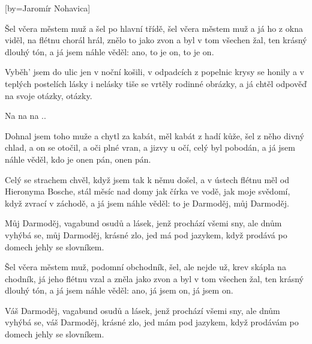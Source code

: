 [by={Jaromír Nohavica}]

\beginverse{}
Šel včera městem muž a šel po hlavní třídě,
šel včera městem muž a já ho z okna viděl,
na flétnu chorál hrál, znělo to jako zvon
a byl v tom všechen žal, ten krásný dlouhý tón,
a já jsem náhle věděl: ano, to je on, to je on.
\endverse{}

\beginverse{}
Vyběh' jsem do ulic jen v noční košili,
v odpadcích z popelnic krysy se honily
a v teplých postelích lásky i nelásky
tiše se vrtěly rodinné obrázky,
a já chtěl odpověď na svoje otázky, otázky.
\endverse{}

\beginchorus{}
Na na na ..    
       
\endchorus{}

\beginverse{}
Dohnal jsem toho muže a chytl za kabát,
měl kabát z hadí kůže, šel z něho divný chlad,
a on se otočil, a oči plné vran,
a jizvy u očí, celý byl pobodán,
a já jsem náhle věděl, kdo je onen pán, onen pán.
\endverse{}

\beginverse{}
Celý se strachem chvěl, když jsem tak k němu došel,
a v ústech flétnu měl od Hieronyma Bosche,
stál měsíc nad domy jak čírka ve vodě,
jak moje svědomí, když zvrací v záchodě,
a já jsem náhle věděl: to je Darmoděj, můj Darmoděj.
\endverse{}

\beginchorus{}
Můj Darmoděj, vagabund osudů a lásek,
jenž prochází všemi sny, ale dnům vyhýbá se,
můj Darmoděj, krásné zlo, jed má pod jazykem,
když prodává po domech jehly se slovníkem.
\endchorus{}

\beginverse{}
Šel včera městem muž, podomní obchodník,
šel, ale nejde už, krev skápla na chodník,
já jeho flétnu vzal a zněla jako zvon
a byl v tom všechen žal, ten krásný dlouhý tón,
a já jsem náhle věděl: ano, já jsem on, já jsem on.
\endverse{}

\beginchorus{}
Váš Darmoděj, vagabund osudů a lásek,
jenž prochází všemi sny, ale dnům vyhýbá se,
váš Darmoděj, krásné zlo, jed mám pod jazykem,
když prodávám po domech jehly se slovníkem.
\endchorus{}

\endsong{}
